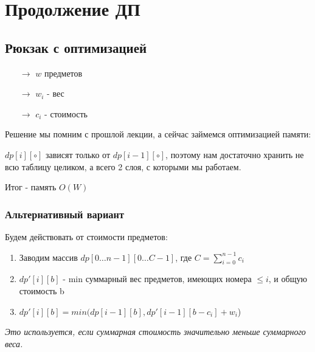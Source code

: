 
\section{Продолжение ДП}

\subsection{Рюкзак с оптимизацией}

\begin{enumerate}
  \item[$\longrightarrow$] \(w\) предметов
  \item[$\longrightarrow$] \(w_i\) - вес
  \item[$\longrightarrow$] \(c_i\) - стоимость  
\end{enumerate}

Решение мы помним с прошлой лекции, а сейчас займемся оптимизацией памяти:

\(dp[i][\circ]\) зависят только от $dp[i - 1][\circ]$, поэтому нам достаточно хранить не всю таблицу целиком, а всего 2 слоя, с которыми мы работаем.

Итог - память \(O(W)\)

\subsubsection{Альтернативный вариант}

Будем действовать от стоимости предметов:

\begin{enumerate}
  \item Заводим массив $dp[0\dots n-1][0\dots C-1]$, где $C = \sum_{i = 0} ^ {n - 1} c_i$
  \item $dp'[i][b]$ - min суммарный вес предметов, имеющих номера \(\le i\), и общую стоимость b
  \item $dp'[i][b] = min(dp[i-1][b], dp'[i-1][b-c_i] + w_i$)
\end{enumerate}
\textit{Это используется, если суммарная стоимость значительно меньше суммарного веса.}


